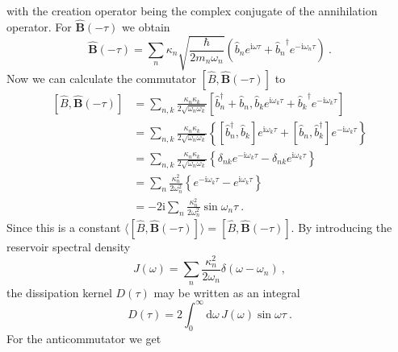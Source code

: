 	with the creation operator being the complex conjugate of the annihilation operator.
	For $\boldsymbol{\hat{B}}(-\tau)$ we obtain
	\begin{equation}
		\boldsymbol{\hat{B}}(-\tau) =	\sum_n \kappa_n \sqrt{\frac{\hbar}{2 m_n \omega_n}} \left({\hat{b}_n}e^{\mathrm{i} \omega \tau} + {\hat{b}_n}^\dagger e^{-\mathrm{i} \omega_n \tau} \right)~.
	\end{equation}
	Now we can calculate the commutator $[\hat{B}, \boldsymbol{\hat{B}}(-\tau) ]$ to
	\begin{equation} \label{Eq::Bath-commutator-calculation}
		\begin{split}
			\left[\hat{B}, \boldsymbol{\hat{B}}(-\tau) \right] &=	\sum_{n,k}^{} \frac{\kappa_n \kappa_k}{2 \sqrt{\omega_n \omega_k}} \left[\hat{b}_n^\dagger + \hat{b}_n , {\hat{b}_k}e^{\mathrm{i} \omega_k \tau} + {\hat{b}_k}^\dagger e^{-\mathrm{i} \omega_k \tau} \right] \\
			&= \sum_{n,k}^{} \frac{\kappa_n \kappa_k}{2 \sqrt{\omega_n \omega_k}} \left\{\left[\hat{b}_n^\dagger, \hat{b}_k\right] e^{\mathrm{i}\omega_k \tau} + \left[\hat{b}_n, \hat{b}_k^\dagger\right] e^{-\mathrm{i}\omega_k \tau}\right\} \\
			&= \sum_{n,k}^{} \frac{\kappa_n \kappa_k}{2 \sqrt{\omega_n \omega_k}} \left\{\delta_{nk} e^{-\mathrm{i}\omega_k \tau} - \delta_{nk} e^{\mathrm{i}\omega_k \tau}\right\} \\
			&= \sum_{n}^{} \frac{\kappa_n^2 }{2 {\omega_n^2}} \left\{e^{-\mathrm{i}\omega_k \tau} - e^{\mathrm{i}\omega_k \tau}\right\} \\
			&= - 2 \mathrm{i}  \sum_{n}^{} \frac{\kappa_n^2 }{2 {\omega_n^2}} \sin \omega_n \tau~.
		\end{split}
	\end{equation}
	Since this is a constant $\langle [\hat{B}, \boldsymbol{\hat{B}}(-\tau) ]  \rangle =	[\hat{B}, \boldsymbol{\hat{B}}(-\tau) ]$. By introducing the reservoir spectral density
	\begin{equation} \label{Eq::spectral-density-delta}
		J(\omega) =	\sum_n 	\frac{\kappa_n^2}{2 \omega_n} \delta(\omega - \omega_n)~,
	\end{equation}
	the dissipation kernel $D(\tau)$ may be written as an integral
	\begin{equation}
		D(\tau) = 2 \int_{0}^{\infty} \text{d}\omega\, J(\omega) \sin \omega \tau~.
	\end{equation}
	For the anticommutator we get
